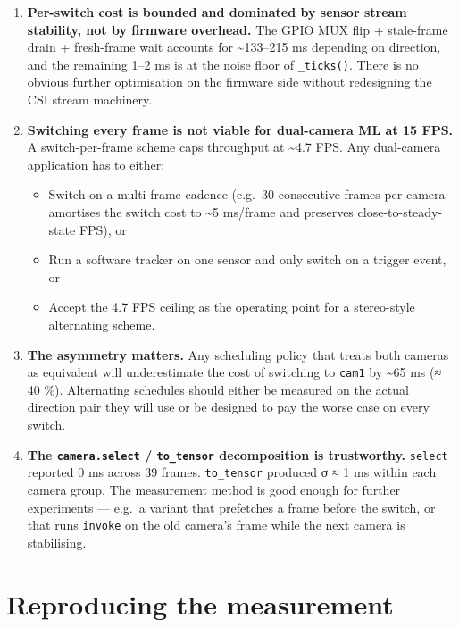 \begin{enumerate}
\def\labelenumi{\arabic{enumi}.}
\tightlist
\item
  \textbf{Per-switch cost is bounded and dominated by sensor stream
  stability, not by firmware overhead.} The GPIO MUX flip + stale-frame
  drain + fresh-frame wait accounts for \textasciitilde133--215 ms
  depending on direction, and the remaining 1--2 ms is at the noise
  floor of \texttt{\_ticks()}. There is no obvious further optimisation
  on the firmware side without redesigning the CSI stream machinery.
\item
  \textbf{Switching every frame is not viable for dual-camera ML at 15
  FPS.} A switch-per-frame scheme caps throughput at \textasciitilde4.7
  FPS. Any dual-camera application has to either:

  \begin{itemize}
  \tightlist
  \item
    Switch on a multi-frame cadence (e.g.~30 consecutive frames per
    camera amortises the switch cost to \textasciitilde5 ms/frame and
    preserves close-to-steady-state FPS), or
  \item
    Run a software tracker on one sensor and only switch on a trigger
    event, or
  \item
    Accept the 4.7 FPS ceiling as the operating point for a stereo-style
    alternating scheme.
  \end{itemize}
\item
  \textbf{The asymmetry matters.} Any scheduling policy that treats both
  cameras as equivalent will underestimate the cost of switching to
  \texttt{cam1} by \textasciitilde65 ms (≈ 40 \%). Alternating schedules
  should either be measured on the actual direction pair they will use
  or be designed to pay the worse case on every switch.
\item
  \textbf{The \texttt{camera.select} / \texttt{to\_tensor} decomposition
  is trustworthy.} \texttt{select} reported 0 ms across 39 frames.
  \texttt{to\_tensor} produced σ ≈ 1 ms within each camera group. The
  measurement method is good enough for further experiments --- e.g.~a
  variant that prefetches a frame before the switch, or that runs
  \texttt{invoke} on the old camera's frame while the next camera is
  stabilising.
\end{enumerate}

\section{Reproducing the measurement}\label{reproducing-the-measurement}

